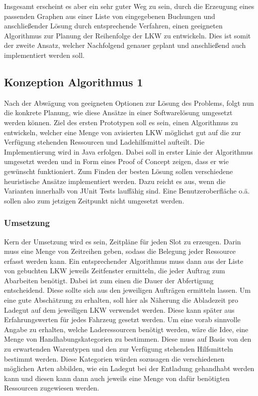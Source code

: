 Insgesamt erscheint es aber ein sehr guter Weg zu sein, durch die Erzeugung eines passenden Graphen aus einer Liste von eingegebenen Buchungen und anschließender Lösung durch entsprechende Verfahren, einen geeigneten Algorithmus zur Planung der Reihenfolge der LKW zu entwickeln. Dies ist somit der zweite Ansatz, welcher Nachfolgend genauer geplant und anschließend auch implementiert werden soll.

\subsection{Konzeption Algorithmus 1}

Nach der Abwägung von geeigneten Optionen zur Lösung des Problems, folgt nun die konkrete Planung, wie diese Ansätze in einer Softwarelösung umgesetzt werden können. Ziel des ersten Prototypen soll es sein, einen Algorithmus zu entwickeln, welcher eine Menge von avisierten LKW möglichst gut auf die zur Verfügung stehenden Ressourcen und Ladehilfsmittel aufteilt. Die Implementierung wird in Java erfolgen. Dabei soll in erster Linie der Algorithmus umgesetzt werden und in Form eines Proof of Concept zeigen, dass er wie gewünscht funktioniert. Zum Finden der besten Lösung sollen verschiedene heuristische Ansätze implementiert werden. Dazu reicht es aus, wenn die Varianten innerhalb von JUnit Tests lauffähig sind. Eine Benutzeroberfläche o.ä. sollen also zum jetzigen Zeitpunkt nicht umgesetzt werden.

\subsubsection{Umsetzung}

Kern der Umsetzung wird es sein, Zeitpläne für jeden Slot zu erzeugen. Darin muss eine Menge von Zeitreihen geben, sodass die Belegung jeder Ressource erfasst werden kann. Ein entsprechender Algorithmus muss dann aus der Liste von gebuchten LKW jeweils Zeitfenster ermitteln, die jeder Auftrag zum Abarbeiten benötigt. Dabei ist zum einen die Dauer der Abfertigung entscheidend. Diese sollte sich aus den jeweiligen Aufträgen ermitteln lassen. Um eine gute Abschätzung zu erhalten, soll hier als Näherung die Abladezeit pro Ladegut auf dem jeweiligen LKW verwendet werden. Diese kann später aus Erfahrungswerten für jedes Fahrzeug gesetzt werden. Um eine vorab sinnvolle Angabe zu erhalten, welche Laderessourcen benötigt werden, wäre die Idee, eine Menge von Handhabungskategorien zu bestimmen. Diese muss auf Basis von den zu erwartenden Warentypen und den zur Verfügung stehenden Hilfsmitteln bestimmt werden. Diese Kategorien würden sozusagen die verschiedenen möglichen Arten abbilden, wie ein Ladegut bei der Entladung gehandhabt werden kann und diesen kann dann auch jeweils eine Menge von dafür benötigten Ressourcen zugewiesen werden.

